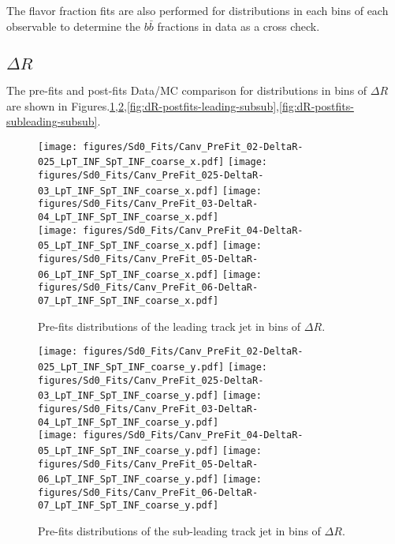 
The flavor fraction fits are also performed for \sdzero distributions in each bins of each observable to determine the $b\bar b $ fractions in data as a cross check. 

\subsection{$\Delta R$}

The pre-fits and post-fits Data/MC comparison for \sdzero distributions in bins of $\Delta R$ are shown in Figures.\ref{fig:dR-prefits-leading-subsub},\ref{fig:dR-prefits-subleading-subsub},\ref{fig:dR-postfits-leading-subsub},\ref{fig:dR-postfits-subleading-subsub}.


\begin{figure}[htbp]
  \centering
 \texttt{[image: figures/Sd0\_Fits/Canv\_PreFit\_02-DeltaR-025\_LpT\_INF\_SpT\_INF\_coarse\_x.pdf]}
 \texttt{[image: figures/Sd0\_Fits/Canv\_PreFit\_025-DeltaR-03\_LpT\_INF\_SpT\_INF\_coarse\_x.pdf]}
 \texttt{[image: figures/Sd0\_Fits/Canv\_PreFit\_03-DeltaR-04\_LpT\_INF\_SpT\_INF\_coarse\_x.pdf]}\\
 \texttt{[image: figures/Sd0\_Fits/Canv\_PreFit\_04-DeltaR-05\_LpT\_INF\_SpT\_INF\_coarse\_x.pdf]}
 \texttt{[image: figures/Sd0\_Fits/Canv\_PreFit\_05-DeltaR-06\_LpT\_INF\_SpT\_INF\_coarse\_x.pdf]}
 \texttt{[image: figures/Sd0\_Fits/Canv\_PreFit\_06-DeltaR-07\_LpT\_INF\_SpT\_INF\_coarse\_x.pdf]}\\

\caption{Pre-fits \sdzero distributions of the leading track jet in bins of $\Delta R$. }
  \label{fig:dR-prefits-leading-subsub}
\end{figure}


\begin{figure}[htbp]
  \centering
 \texttt{[image: figures/Sd0\_Fits/Canv\_PreFit\_02-DeltaR-025\_LpT\_INF\_SpT\_INF\_coarse\_y.pdf]}
 \texttt{[image: figures/Sd0\_Fits/Canv\_PreFit\_025-DeltaR-03\_LpT\_INF\_SpT\_INF\_coarse\_y.pdf]}
 \texttt{[image: figures/Sd0\_Fits/Canv\_PreFit\_03-DeltaR-04\_LpT\_INF\_SpT\_INF\_coarse\_y.pdf]}\\
 \texttt{[image: figures/Sd0\_Fits/Canv\_PreFit\_04-DeltaR-05\_LpT\_INF\_SpT\_INF\_coarse\_y.pdf]}
 \texttt{[image: figures/Sd0\_Fits/Canv\_PreFit\_05-DeltaR-06\_LpT\_INF\_SpT\_INF\_coarse\_y.pdf]}
 \texttt{[image: figures/Sd0\_Fits/Canv\_PreFit\_06-DeltaR-07\_LpT\_INF\_SpT\_INF\_coarse\_y.pdf]}\\

\caption{Pre-fits \sdzero distributions of the sub-leading track jet in bins of $\Delta R$. }
  \label{fig:dR-prefits-subleading-subsub}
\end{figure}

